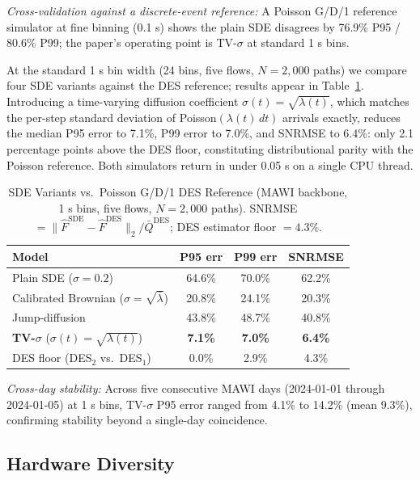\documentclass{ieeeaccess}
\begin{document}
\textit{Cross-validation against a discrete-event reference:}
A Poisson G/D/1 reference simulator at fine binning (0.1 s) shows the plain SDE disagrees by
76.9\% P95 / 80.6\% P99; the paper's operating point is TV-$\sigma$ at standard 1 s bins.

At the standard 1 s bin width (24 bins, five flows, $N=2{,}000$ paths) we compare four SDE
variants against the DES reference; results appear in Table~\ref{tab:sde_des_comparison}.
Introducing a time-varying diffusion coefficient $\sigma(t)=\sqrt{\lambda(t)}$, which matches
the per-step standard deviation of Poisson$(\lambda(t)\,dt)$ arrivals exactly, reduces the
median P95 error to 7.1\%, P99 error to 7.0\%, and SNRMSE to 6.4\%: only 2.1 percentage points
above the DES floor, constituting distributional parity with the Poisson reference. Both
simulators return in under 0.05 s on a single CPU thread.

\begin{table}[!t]
\caption{SDE Variants vs.\ Poisson G/D/1 DES Reference (MAWI backbone, 1 s bins, five flows,
$N=2{,}000$ paths). SNRMSE $= \|\hat{F}^{\mathrm{SDE}}-\hat{F}^{\mathrm{DES}}\|_2 /
\bar{Q}^{\mathrm{DES}}$; DES estimator floor $=4.3\%$.}
\label{tab:sde_des_comparison}
\centering\small
\begin{tabular}{@{}l c c c@{}}
\toprule
Model & P95 err & P99 err & SNRMSE \\
\midrule
Plain SDE ($\sigma=0.2$) & 64.6\% & 70.0\% & 62.2\% \\
Calibrated Brownian ($\sigma=\sqrt{\bar\lambda}$) & 20.8\% & 24.1\% & 20.3\% \\
Jump-diffusion & 43.8\% & 48.7\% & 40.8\% \\
\textbf{TV-$\sigma$} ($\sigma(t)=\sqrt{\lambda(t)}$) & \textbf{7.1\%} & \textbf{7.0\%} & \textbf{6.4\%} \\
\midrule
DES floor (DES$_2$ vs.\ DES$_1$) & 0.0\% & 2.9\% & 4.3\% \\
\bottomrule
\end{tabular}
\end{table}

\textit{Cross-day stability:}
Across five consecutive MAWI days (2024-01-01 through 2024-01-05) at 1 s bins,
TV-$\sigma$ P95 error ranged from 4.1\% to 14.2\% (mean 9.3\%), confirming stability beyond a
single-day coincidence.


\subsection{Hardware Diversity}
\label{subsec:hardware_diversity}
\end{document}
